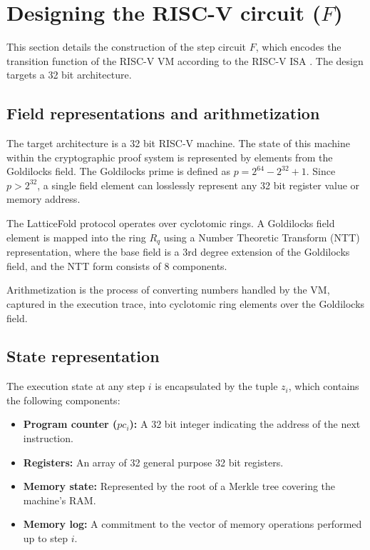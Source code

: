 \section{Designing the RISC-V circuit ($F$)}\label{sec:riscv_circuit}

This section details the construction of the step circuit $F$, which encodes
the transition function of the RISC-V VM according to the RISC-V ISA \cite{RISCV, RISCVUnprivileged}.
The design targets a 32 bit architecture.

\subsection{Field representations and arithmetization}

The target architecture is a 32 bit RISC-V machine. The state of this machine
within the cryptographic proof system is represented by elements from the
Goldilocks field. The Goldilocks prime is defined as $p = 2^{64} - 2^{32} + 1$. Since $p >
	2^{32}$, a single field element can losslessly represent any 32 bit register
value or memory address.

The LatticeFold protocol operates over cyclotomic rings. A Goldilocks field
element is mapped into the ring $R_q$ using a Number Theoretic Transform (NTT)
representation, where the base field is a 3rd degree extension of the Goldilocks
field, and the NTT form consists of 8 components.

Arithmetization is the process of converting numbers handled by the VM,
captured in the execution trace, into cyclotomic ring elements over the
Goldilocks field.

\subsection{State representation}

The execution state at any step $i$ is encapsulated by the tuple $z_i$, which
contains the following components:

\begin{itemize}
	\item \textbf{Program counter ($pc_i$):} A 32 bit integer indicating the address of the next instruction.
	\item \textbf{Registers:} An array of 32 general purpose 32 bit registers.
	\item \textbf{Memory state:} Represented by the root of a Merkle tree covering the machine's RAM.
	\item \textbf{Memory log:} A commitment to the vector of memory operations performed up to step $i$.
\end{itemize}

